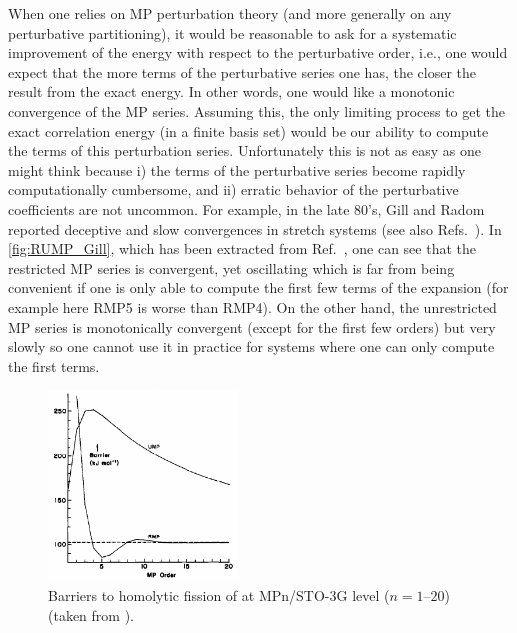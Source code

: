 \documentclass[11pt,a4paper]{article}
\begin{document}
When one relies on MP perturbation theory (and more generally on any perturbative partitioning), it would be reasonable to ask for a systematic improvement of the energy with respect to the perturbative order, i.e., one would expect that the more terms of the perturbative series one has, the closer the result from the exact energy.
In other words, one would like a monotonic convergence of the MP series. Assuming this, the only limiting process to get the exact correlation energy (in a finite basis set) would be our ability to compute the terms of this perturbation series.
Unfortunately this is not as easy as one might think because i) the terms of the perturbative series become rapidly computationally cumbersome, and ii) erratic behavior of the perturbative coefficients are not uncommon. For example, in the late 80's, Gill and Radom reported deceptive and slow convergences in stretch systems \cite{Gill_1986, Gill_1988} (see also Refs.~\cite{Handy_1985, Lepetit_1988}). 
In \autoref{fig:RUMP_Gill}, which has been extracted from Ref.~\cite{Gill_1986}, one can see that the restricted MP series is convergent, yet oscillating which is far from being convenient if one is only able to compute the first few terms of the expansion (for example here RMP5 is worse than RMP4). 
On the other hand, the unrestricted MP series is monotonically convergent (except for the first few orders) but very slowly so one cannot use it in practice for systems where one can only compute the first terms.

\begin{figure}[h!]
    \centering
    \includegraphics[width=0.45\textwidth]{gill1986.png}
    \caption{\centering Barriers to homolytic fission of  at MPn/STO-3G level ($n = 1$--$20$) (taken from \cite{Gill_1986}).}
    \label{fig:RUMP_Gill}
\end{figure}
\end{document}
